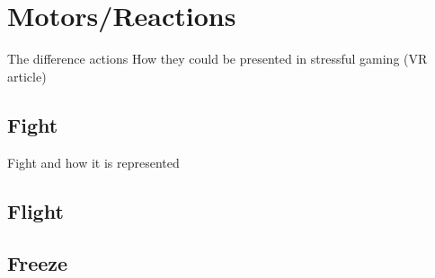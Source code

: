 \section{Motors/Reactions}
The difference actions
How they could be presented in stressful gaming (VR article)



\subsection{Fight}
Fight and how it is represented

\subsection{Flight}

\subsection{Freeze}